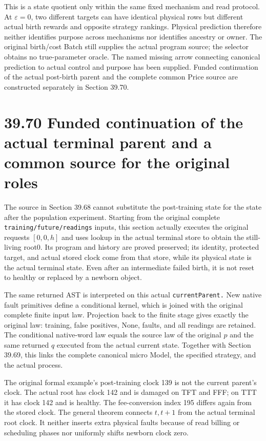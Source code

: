 \documentclass[
  english,
  11pt,
  oneside]{book}
\begin{document}
This is a state quotient only within the same fixed mechanism and read protocol. At \(\varepsilon=0\), two different targets can have identical physical rows but different actual birth rewards and opposite strategy rankings. Physical prediction therefore neither identifies purpose across mechanisms nor identifies ancestry or owner. The original birth/cost Batch still supplies the actual program source; the selector obtains no true-parameter oracle. The named missing arrow connecting canonical prediction to actual control and purpose has been supplied. Funded continuation of the actual post-birth parent and the complete common Price source are constructed separately in Section 39.70.

\section{39.70 Funded continuation of the actual terminal parent and a common source for the original roles}\label{funded-continuation-of-the-actual-terminal-parent-and-a-common-source-for-the-original-roles}

The source in Section 39.68 cannot substitute the post-training state for the state after the population experiment. Starting from the original complete \nolinkurl{training/future/readings} inputs, this section actually executes the original requests \([0,0,h]\) and uses lookup in the actual terminal store to obtain the still-living root0. Its program and history are proved preserved; its identity, protected target, and actual stored clock come from that store, while its physical state is the actual terminal state. Even after an intermediate failed birth, it is not reset to healthy or replaced by a newborn object.

The same returned AST is interpreted on this actual \nolinkurl{currentParent.} New native fault primitives define a conditional kernel, which is joined with the original complete finite input law. Projection back to the finite stage gives exactly the original law: training, false positives, None, faults, and all readings are retained. The conditional native-word law equals the source law of the original \(p\) and the same returned \(q\) executed from the actual current state. Together with Section 39.69, this links the complete canonical micro Model, the specified strategy, and the actual process.

The original formal example's post-training clock 139 is not the current parent's clock. The actual root has clock 142 and is damaged on TFT and FFF; on TTT it has clock 142 and is healthy. The fee-conversion index 195 differs again from the stored clock. The general theorem connects \(t,t+1\) from the actual terminal root clock. It neither inserts extra physical faults because of read billing or scheduling phases nor uniformly shifts newborn clock zero.
\end{document}
